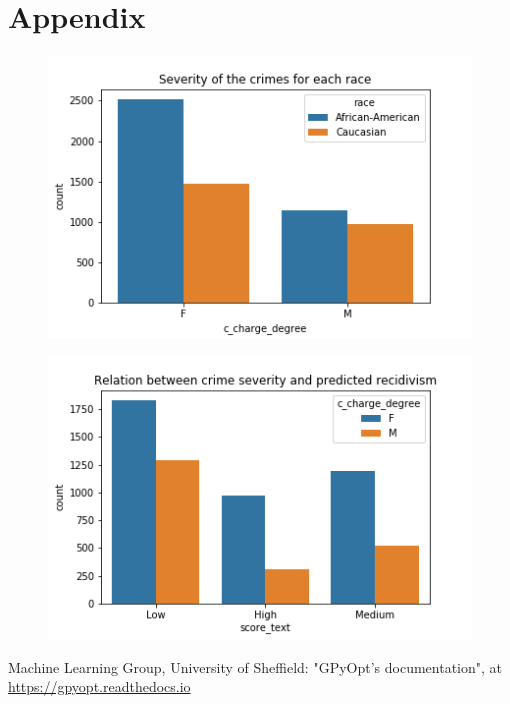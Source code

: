 \documentclass[11pt, fleqn, titlepage]{article}
\begin{document}
	\section{Appendix}
	
	\begin{figure}[H]
		\centering
		\includegraphics[width=0.5\linewidth]{imgs/c_charge_degree}
		\caption{}
		\label{fig:cchargedegree}
	\end{figure}
	
	\begin{figure}[H]
		\centering
		\includegraphics[width=0.5\linewidth]{imgs/charge_degree_score}
		\caption{}
		\label{fig:chargedegreescore}
	\end{figure}
	
	\begin{thebibliography}{9}
		
		 Machine Learning Group, University of Sheffield: "GPyOpt’s documentation", at \url{https://gpyopt.readthedocs.io}
		
		
		
	\end{thebibliography}
	
	\newpage
	
	
\end{document}
